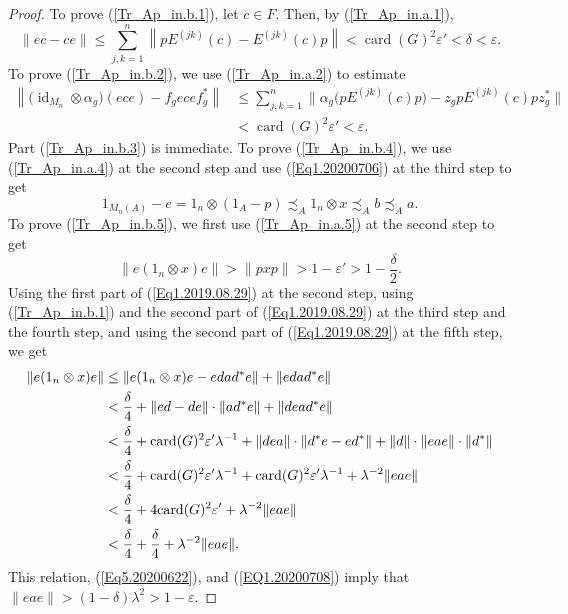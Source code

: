 \documentclass[10pt]{amsart}
\newcounter{TmpEnumi}
\numberwithin{equation}{section}
\theoremstyle{definition}
\newcommand{\dt}{\delta}
\newcommand{\ep}{\varepsilon}
\newcommand{\id}{{\operatorname{id}}}
\newcommand{\card}{{\operatorname{card}}}
\begin{document}
\begin{proof}
To prove (\ref{Tr_Ap_in.b.1}), let $c \in F$.
Then, by (\ref{Tr_Ap_in.a.1}),
\begin{equation*}
\| e c - ce \| 
\leq
\sum_{j,k=1}^{n} \left\| p E^{(jk)} (c) -   E^{(jk)} (c) p \right\| 
<
\card (G)^2 \ep' < \dt < \ep.
\end{equation*}
To prove (\ref{Tr_Ap_in.b.2}), we use (\ref{Tr_Ap_in.a.2}) to estimate
\begin{align*}
\left\| 
\big(\id_{M_n} \otimes \alpha_g\big) (e c e) 
- f_g e c e f^*_g
\right\|
&\leq 
\sum_{j, k=1}^{n} 
\big\| \alpha_g \big(p E^{(jk)} (c ) p \big) 
- 
z_g p E^{(jk)} (c ) p z^*_g \big\|
\\&<
 \card (G)^2 \ep' < \ep.
\end{align*}
Part (\ref{Tr_Ap_in.b.3}) is immediate. 
To prove (\ref{Tr_Ap_in.b.4}), we use (\ref{Tr_Ap_in.a.4}) at the second step and use (\ref{Eq1.20200706}) 
at the third step to get
\begin{equation*}
1_{M_n (A)} - e = 1_{n} \otimes (1_A - p) 
\precsim_A 
 1_{n} \otimes x
\precsim_A
b \precsim_{A} a.
\end{equation*}
To prove (\ref{Tr_Ap_in.b.5}), we first use (\ref{Tr_Ap_in.a.5}) at the second step to get
\begin{equation}
\label{Eq5.20200622}
\| e (1_{n} \otimes x) e \| > \| p x p \| > 1 - \ep' > 1 - \frac{\dt}{2}.
\end{equation}
Using  the first part of (\ref{Eq1.2019.08.29}) at the second step,
 using (\ref{Tr_Ap_in.b.1}) and the second part of (\ref{Eq1.2019.08.29})  at the third step and the fourth step, 
and using the second part of  (\ref{Eq1.2019.08.29}) at the fifth step,
 we get
\begin{align*} 
\| e (1_{n} \otimes x) e \| 
&\leq
\|  e (1_{n} \otimes x) e - e d a d^* e \| + \| e d a d^* e \| 
\\\notag
&<
\frac{\dt}{4} + \| e d  -  d e \| \cdot \| a d^* e \| + \| d e a d^* e \|
\\\notag
&<
\frac{\dt}{4} + \card (G)^2 \ep' \lambda^{-1} + \| d e a \| 
\cdot \|d^* e - e d^*  \| + \| d\| \cdot \| e a  e\| \cdot \| d^* \|
\\\notag
&<
\frac{\dt}{4} + \card (G)^2 \ep' \lambda ^{-1} + \card (G)^2 \ep' \lambda^{-1} + \lambda ^{-2} \| e a  e\|
\\\notag
&<
\frac{\dt}{4} + 4 \card (G)^2 \ep'  + \lambda ^{-2} \| e a  e\|
\\\notag
&<
\frac{\dt}{4} + \frac{\dt}{4} + \lambda ^{-2} \| e a  e\|.
\end{align*}
This relation, (\ref{Eq5.20200622}), and (\ref{EQ1.20200708}) imply that
$
\| e a  e\| > (1 - \dt) \lambda ^2> 1-\ep.
$
\end{proof}
\end{document}
